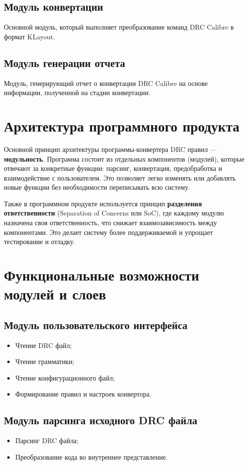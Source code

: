 \subsection{Модуль конвертации}
Основной модуль, который выполняет преобразование команд DRC Calibre
в формат KLayout.

\subsection{Модуль генерации отчета}
Модуль, генерирующий отчет о конвертации DRC Calibre на основе информации,
полученной на стадии конвертации.

\section{Архитектура программного продукта}

Основной принцип архитектуры программы-конвертера DRC правил
--- \textbf{модульность}.
Программа состоит из отдельных компонентов (модулей),
которые отвечают за конкретные функции:
парсинг, конвертация, предобработка и взаимодействие с пользователем.
Это позволяет легко изменять или добавлять новые функции
без необходимости переписывать всю систему.\par
Также в программном продукте используется принцип
\textbf{разделения ответственности} 
(Separation of Concerns или SoC), где каждому модулю назначена
своя ответственность, что снижает взаимозависимость между компонентами.
Это делает систему более поддерживаемой и упрощает тестирование и отладку.

\section{Функциональные возможности модулей и слоев}

\subsection{Модуль пользовательского интерфейса}
\begin{itemize}
	\item Чтение DRC файл;
	\item Чтение грамматики;
	\item Чтение конфигурационного файл;
	\item Формирование правил и настроек конвертора.
\end{itemize}

\subsection{Модуль парсинга исходного DRC файла}
\begin{itemize}
	\item Парсинг DRC файла;
	\item Преобразование кода во внутреннее представление.
\end{itemize}

